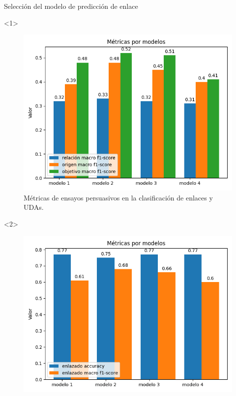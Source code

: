 \documentclass{beamer}
\begin{document}
\begin{frame}{Selección del modelo de predicción de enlace}
    \begin{onlyenv}<1>
        \begin{figure}
            \includegraphics[scale=0.6]{Graphics/persuasive_essays_all_linked_all_relation_f1_scores.png}
            \caption{Métricas de ensayos persuasivos en la clasificación de enlaces y UDAs.}
        \end{figure}
    \end{onlyenv}
    \begin{onlyenv}<2>
        \begin{figure}
            \includegraphics[scale=0.6]{Graphics/persuasive_essays_all_linked_all_relation_linked.png}

\end{figure}
\end{onlyenv}
\end{frame}
\end{document}
